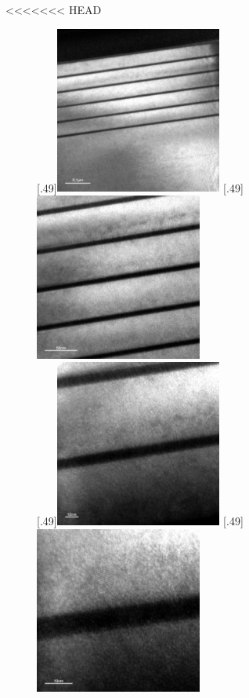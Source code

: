 \documentclass[a4paper,11pt,DIV=11]{scrartcl}
\begin{document}
<<<<<<< HEAD
\begin{figure}[htb]\centering
	[.49\linewidth]{\includegraphics[width=0.49\textwidth]{Versuchsdaten/11/34000x.jpg}}
	[.49\linewidth]{\includegraphics[width=0.49\textwidth]{Versuchsdaten/11/87000x.jpg}}\\
	[.49\linewidth]{\includegraphics[width=0.49\textwidth]{Versuchsdaten/11/185000x.jpg}}
	[.49\linewidth]{\includegraphics[width=0.49\textwidth]{Versuchsdaten/11/380000x.jpg}}

\end{figure}
\end{document}
